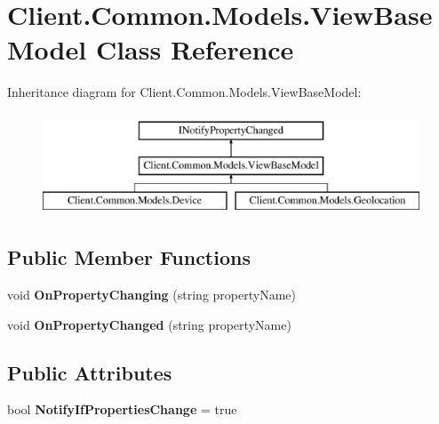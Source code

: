 \hypertarget{classClient_1_1Common_1_1Models_1_1ViewBaseModel}{\section{Client.\-Common.\-Models.\-View\-Base\-Model Class Reference}
\label{classClient_1_1Common_1_1Models_1_1ViewBaseModel}
}
Inheritance diagram for Client.\-Common.\-Models.\-View\-Base\-Model\-:\begin{figure}[H]
\begin{center}
\leavevmode
\includegraphics[height=3.000000cm]{classClient_1_1Common_1_1Models_1_1ViewBaseModel}
\end{center}
\end{figure}
\subsection*{Public Member Functions}
\begin{DoxyCompactItemize}
\item 
\hypertarget{classClient_1_1Common_1_1Models_1_1ViewBaseModel_a997c58390fa1515349afa15ee0f7e011}{void {\bfseries On\-Property\-Changing} (string property\-Name)}\label{classClient_1_1Common_1_1Models_1_1ViewBaseModel_a997c58390fa1515349afa15ee0f7e011}

\item 
\hypertarget{classClient_1_1Common_1_1Models_1_1ViewBaseModel_a002174135d9aa86dd16a2da9913a4282}{void {\bfseries On\-Property\-Changed} (string property\-Name)}\label{classClient_1_1Common_1_1Models_1_1ViewBaseModel_a002174135d9aa86dd16a2da9913a4282}

\end{DoxyCompactItemize}
\subsection*{Public Attributes}
\begin{DoxyCompactItemize}
\item 
\hypertarget{classClient_1_1Common_1_1Models_1_1ViewBaseModel_a297e760135ca5bbbb3c603b88404fcc5}{bool {\bfseries Notify\-If\-Properties\-Change} = true}\label{classClient_1_1Common_1_1Models_1_1ViewBaseModel_a297e760135ca5bbbb3c603b88404fcc5}

\end{DoxyCompactItemize}

